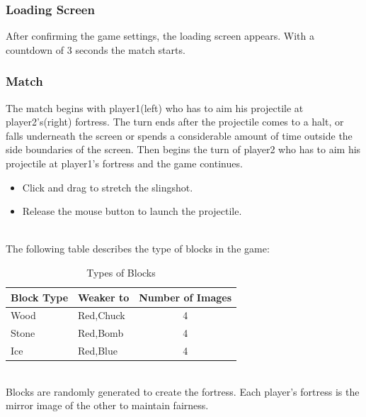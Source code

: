 \documentclass[12pt]{article}
\newcounter{subsubsubsection}[subsubsection]
\begin{document}
\subsubsection{Loading Screen}
After confirming the game settings, the loading screen appears. With a countdown of 3 seconds the match starts.

\subsubsection{Match}
The match begins with player1(left) who has to aim his projectile at player2's(right) fortress. The turn ends after the projectile comes to a halt, or falls underneath the screen or spends a considerable amount of time outside the side boundaries of the screen. Then begins the turn of player2 who has to aim his projectile at player1's fortress and the game continues. \\
\begin{itemize}
    \item Click and drag to stretch the slingshot.
    \item Release the mouse button to launch the projectile.
\end{itemize}\\

The following table describes the type of blocks in the game:
\begin{table}[h!]
\centering
\label{tab:Blocks}
\begin{tabular}{@{}|l|l|c|@{}}
\toprule
\hline
\textbf{Block Type} & \textbf{Weaker to} & \textbf{Number of Images} \\
\midrule
\hline
Wood & Red,Chuck & 4 \\
\hline
Stone & Red,Bomb & 4 \\
\hline
Ice & Red,Blue & 4 \\
\hline
\bottomrule
\end{tabular}
\caption{Types of Blocks}
\end{table}\\
Blocks are randomly generated to create the fortress. Each player's fortress is the mirror image of the other to maintain fairness.\\
\end{document}
